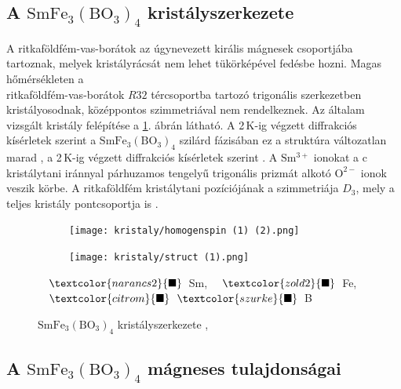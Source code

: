 \documentclass[a4paper,12pt]{article}
\numberwithin{equation}{section}
\begin{document}
\subsection{A \texorpdfstring{$\bm{\mathrm{SmFe_3(BO_3)_4}}$}{TEXT} kristályszerkezete }
 A ritkaföldfém-vas-borátok az úgynevezett királis mágnesek csoportjába tartoznak, melyek kristályrácsát nem lehet tükörképével fedésbe hozni. Magas hőmérsékleten a \\
 ritkaföldfém-vas-borátok $R32$ tércsoportba tartozó trigonális szerkezetben kristályosodnak, középpontos szimmetriával nem rendelkeznek. Az általam vizsgált kristály felépítése a \ref{fig:kristalyszerk}. ábrán látható. A 2\,K-ig végzett diffrakciós kísérletek szerint a $\mathrm{SmFe_3(BO_3)_4}$ szilárd fázisában ez a struktúra változatlan marad \cite{2010_Phys_Lett,2010_JETP}, a 2\,K-ig végzett diffrakciós kísérletek szerint \cite{2010_Phys_Lett, 2012_JPhys}. A $\mathrm{Sm^{3+}}$ ionokat a c kristálytani iránnyal párhuzamos tengelyű trigonális prizmát alkotó $\mathrm{O}^{2-}$ ionok veszik körbe. A ritkaföldfém kristálytani pozíciójának a szimmetriája $D_3$, mely a teljes kristály pontcsoportja is \cite{2014_JETP}. 



    \begin{figure}[H]
\centering
\begin{subfigure}[b]{0.4\linewidth}
\texttt{[image: kristaly/homogenspin (1) (2).png]}


\end{subfigure}
\begin{subfigure}[b]{0.4\linewidth}
\texttt{[image: kristaly/struct (1).png]}


\end{subfigure}

$\quad\textcolor{narancs2}{\blacksquare}\,$ Sm, $\quad\textcolor{zold2}{\blacksquare}\,$ Fe, $\quad\textcolor{citrom}{\blacksquare}\,$ $\textcolor{szurke}{\blacksquare}\,$ B

\caption{$\mathrm{SmFe_3(BO_3)_4}$ kristályszerkezete \cite{2018_PRL}, }
\label{fig:kristalyszerk}
\end{figure}

\subsection{A \texorpdfstring{$\bm{\mathrm{SmFe_3(BO_3)_4}}$}{TEXT} mágneses tulajdonságai \label{magnch}}
\end{document}
